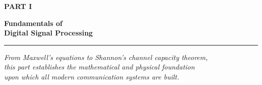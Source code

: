 
\cleardoublepage
\thispagestyle{empty}  %

\vspace*{40pt}  %

\begin{center}

{\sffamily\bfseries\fontsize{60}{68}\selectfont PART I}

\vspace{30pt}

{\sffamily\bfseries\fontsize{48}{56}\selectfont Fundamentals of\\Digital Signal Processing}

\vspace{20pt}

\rule{0.5\textwidth}{0.4pt}  %

\vspace{20pt}

{\itshape\large
From Maxwell's equations to Shannon's channel capacity theorem,\\
this part establishes the mathematical and physical foundation\\
upon which all modern communication systems are built.
}

\end{center}

\vspace{80pt}  %

\clearpage

